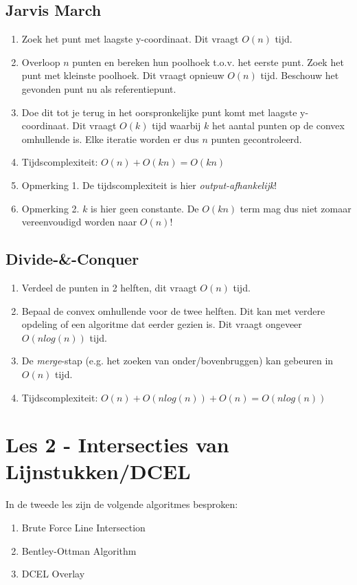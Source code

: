 \documentclass[12pt,a4paper]{article}
\begin{document}
		\subsection{Jarvis March}
			\begin{enumerate}
				\item Zoek het punt met laagste y-coordinaat. Dit vraagt $O(n)$ tijd.
				\item Overloop $n$ punten en bereken hun poolhoek t.o.v. het eerste punt. Zoek het punt met kleinste poolhoek. Dit vraagt opnieuw $O(n)$ tijd. Beschouw het gevonden punt nu als referentiepunt.
				\item Doe dit tot je terug in het oorspronkelijke punt komt met laagste y-coordinaat. Dit vraagt $O(k)$ tijd waarbij $k$ het aantal punten op de convex omhullende is. Elke iteratie worden er dus $n$ punten gecontroleerd.
				\item Tijdscomplexiteit: $O(n) + O(kn) = O(kn)$
				\item Opmerking 1. De tijdscomplexiteit is hier \emph{output-afhankelijk}!
				\item Opmerking 2. $k$ is hier geen constante. De $O(kn)$ term mag dus niet zomaar vereenvoudigd worden naar $O(n)$!
			\end{enumerate}
		
		\subsection{Divide-\&-Conquer}
			\begin{enumerate}
				\item Verdeel de punten in 2 helften, dit vraagt $O(n)$ tijd. 
				\item Bepaal de convex omhullende voor de twee helften. Dit kan met verdere opdeling of een algoritme dat eerder gezien is. Dit vraagt ongeveer $O(n log (n))$ tijd.
				\item De \emph{merge}-stap (e.g. het zoeken van onder/bovenbruggen) kan gebeuren in $O(n)$ tijd. 
				\item Tijdscomplexiteit: $O(n) + O(n log (n)) + O(n) = O(n log (n))$
			\end{enumerate}
	\section{Les 2 - Intersecties van Lijnstukken/DCEL}
		In de tweede les zijn de volgende algoritmes besproken:
		\begin{enumerate}
			\item Brute Force Line Intersection
			\item Bentley-Ottman Algorithm
			\item DCEL Overlay
		\end{enumerate}
	
\end{document}
